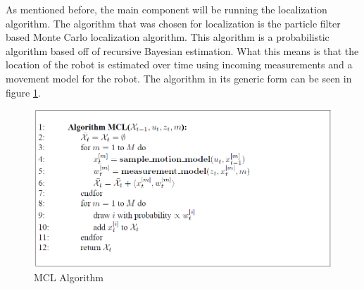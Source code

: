 \documentclass{article}
\begin{document}
As mentioned before, the main component will be running the localization algorithm. The algorithm that was chosen for localization is the particle filter based Monte Carlo localization algorithm. This algorithm is a probabilistic algorithm based off of recursive Bayesian estimation\citep{ProbRob}. What this means is that the location of the robot is estimated over time using incoming measurements and a movement model for the robot. The algorithm in its generic form can be seen in figure \ref{fig:mcl}.\\

\begin{figure}[h!]
\centering
\includegraphics[scale=0.45]{mcl_algorithm.png}
\caption{MCL Algorithm}
\label{fig:mcl}
\end{figure}
\end{document}
